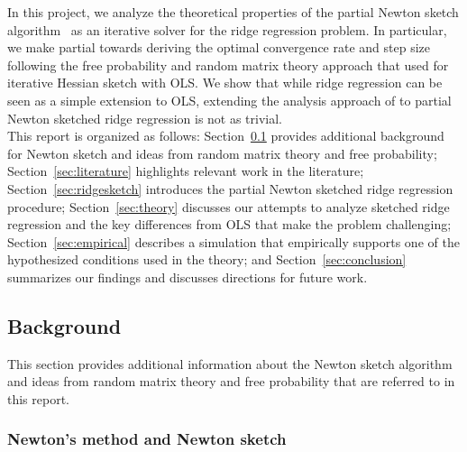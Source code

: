 In this project, we analyze the theoretical properties of the partial Newton sketch algorithm~\citep{Pilanci:2017} as an iterative solver for the ridge regression problem. In particular, we make partial towards deriving the optimal convergence rate and step size following the free probability and random matrix theory approach that \citet{Lacotte:2020} used for iterative Hessian sketch with OLS. We show that while ridge regression can be seen as a simple extension to OLS, extending the analysis approach of \citet{Lacotte:2020} to partial Newton sketched ridge regression is not as trivial.
\\

This report is organized as follows: Section~\ref{sec:background} provides additional background for Newton sketch and ideas from random matrix theory and free probability; Section~\ref{sec:literature} highlights relevant work in the literature; Section~\ref{sec:ridgesketch} introduces the partial Newton sketched ridge regression procedure; Section~\ref{sec:theory} discusses our attempts to analyze sketched ridge regression and the key differences from OLS that make the problem challenging; Section~\ref{sec:empirical} describes a simulation that empirically supports one of the hypothesized conditions used in the theory; and Section~\ref{sec:conclusion} summarizes our findings and discusses directions for future work.

\subsection{Background} \label{sec:background}

This section provides additional information about the Newton sketch algorithm and ideas from random matrix theory and free probability that are referred to in this report.

\subsubsection{Newton's method and Newton sketch} \label{sec:newton}

